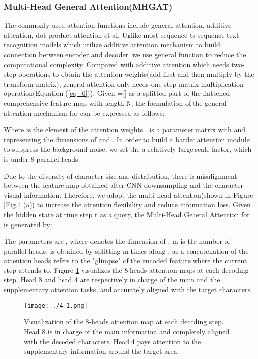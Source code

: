 \documentclass[runningheads]{llncs}
\begin{document}
\subsubsection{Multi-Head General Attention(MHGAT)}
The commonly used attention functions include general attention, additive attention, dot product attention et al. Unlike most sequence-to-sequence text recognition models which utilize additive attention mechanism to build connection between encoder and decoder\cite{shi2018aster,litman2020scatter,li2019show}, we use general function\cite{luong2015effective} to reduce the computational complexity. Compared with additive attention\cite{bahdanau2014neural} which needs two-step operations to obtain the attention weights(add first and then multiply by the transform matrix), general attention only needs one-step matrix multiplication operation(Equation (\ref{eq_6})). Given =[] as a splitted part of the flattened comprehensive feature map  with length N, the formulation of the general attention mechanism for  can be expressed as follows:




Where  is the  element of the attention weights .  is a parameter matrix with  and  representing the dimensions of  and . In order to build a harder attention module to suppress the background noise, we set the a relatively large scale factor, which is   under 8 parallel heads.

Due to the diversity of character size and distribution, there is misalignment between the feature map obtained after CNN downsampling and the character visual information. Therefore, we adopt the multi-head attention(shown in Figure \ref{Fig.4}(a)) to increase the attention flexibility and reduce information loss. Given the hidden state  at time step t as a query, the Multi-Head General Attention for  is generated by:



The parameters are , where  denotes the dimension of , m is the number of parallel heads.  is obtained by splitting m times along .  as a concatenation of the attention heads refers to the "glimpse" of the encoded feature where the current step attends to. Figure \ref{Fig.2} visualizes the 8-heads attention maps at each decoding step. Head 8 and head 4 are respectively in charge of the main and the supplementary attention tasks, and accurately aligned with the target characters.
\begin{figure}
\centering
\texttt{[image: ./4\_1.png]}
\caption{Visualization of the 8-heads attention map at each decoding step. Head 8 is in charge of the main information and completely aligned with the decoded characters. Head 4 pays attention to the supplementary information around the target area.} 
\label{Fig.2}
\end{figure}
\end{document}
